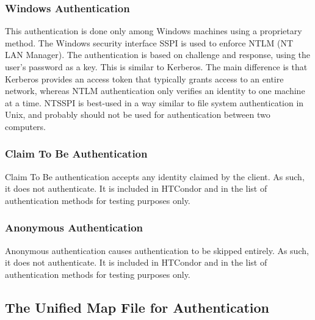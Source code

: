 \subsubsection{\label{sec:NTSSPI-Authentication}Windows Authentication}
This authentication is done only among Windows machines using
a proprietary method.
The Windows security interface SSPI is used to enforce NTLM
(NT LAN Manager).
The authentication is based on challenge and response, using the user's
password as a key.
This is similar to Kerberos.
The main difference 
is that Kerberos provides an access token that typically grants
access to an entire network, whereas NTLM authentication only 
verifies an identity to one machine at a time.
NTSSPI is best-used in a way similar to file system authentication in
Unix, and probably should not be used for authentication between two
computers. 

\subsubsection{\label{sec:CLAIM-Authentication}Claim To Be Authentication}
Claim To Be authentication accepts any identity claimed by the client.
As such, it does not authenticate.
It is included in HTCondor and in the list of authentication methods
for testing purposes only.

\subsubsection{\label{sec:ANON-Authentication}Anonymous Authentication}
Anonymous authentication causes authentication to be skipped entirely.
As such, it does not authenticate.
It is included in HTCondor and in the list of authentication methods
for testing purposes only.


\subsection{\label{sec:Security-Unified-Map-File}The Unified Map File for Authentication}

